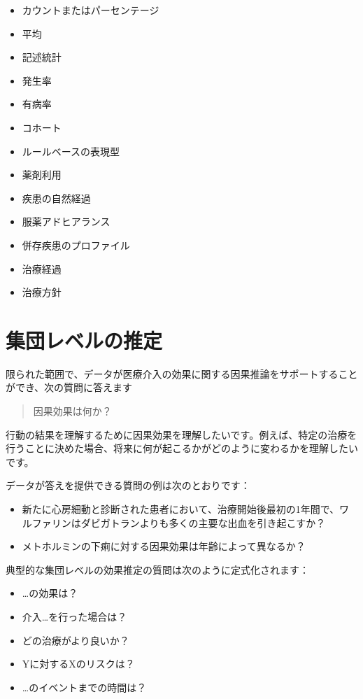 \documentclass[
  11pt]{book}
\providecommand{\tightlist}{%
  \setlength{\itemsep}{0pt}\setlength{\parskip}{0pt}}
\theoremstyle{definition}
\theoremstyle{definition}
\theoremstyle{definition}
\theoremstyle{definition}
\theoremstyle{remark}
\begin{document}
\begin{itemize}
\tightlist
\item
  カウントまたはパーセンテージ
\item
  平均
\item
  記述統計
\item
  発生率
\item
  有病率
\item
  コホート
\item
  ルールベースの表現型
\item
  薬剤利用
\item
  疾患の自然経過
\item
  服薬アドヒアランス
\item
  併存疾患のプロファイル
\item
  治療経過
\item
  治療方針
\end{itemize}

\section{集団レベルの推定}\label{ux96c6ux56e3ux30ecux30d9ux30ebux306eux63a8ux5b9a}


限られた範囲で、データが医療介入の効果に関する因果推論をサポートすることができ、次の質問に答えます

\begin{quote}
因果効果は何か？
\end{quote}

行動の結果を理解するために因果効果を理解したいです。例えば、特定の治療を行うことに決めた場合、将来に何が起こるかがどのように変わるかを理解したいです。

データが答えを提供できる質問の例は次のとおりです：

\begin{itemize}
\tightlist
\item
  新たに心房細動と診断された患者において、治療開始後最初の1年間で、ワルファリンはダビガトランよりも多くの主要な出血を引き起こすか？
\item
  メトホルミンの下痢に対する因果効果は年齢によって異なるか？
\end{itemize}

典型的な集団レベルの効果推定の質問は次のように定式化されます：

\begin{itemize}
\tightlist
\item
  \ldots の効果は？
\item
  介入\ldots を行った場合は？
\item
  どの治療がより良いか？
\item
  Yに対するXのリスクは？
\item
  \ldots のイベントまでの時間は？
\end{itemize}
\end{document}
